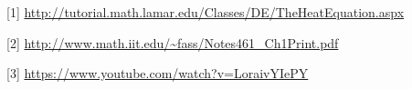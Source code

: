 \documentclass[12pt,fleqn]{article}\usepackage{../../common}
\begin{document}
[1] \url{http://tutorial.math.lamar.edu/Classes/DE/TheHeatEquation.aspx}

[2] \url{http://www.math.iit.edu/~fass/Notes461_Ch1Print.pdf}

[3] \url{https://www.youtube.com/watch?v=LoraivYIePY}
\end{document}
